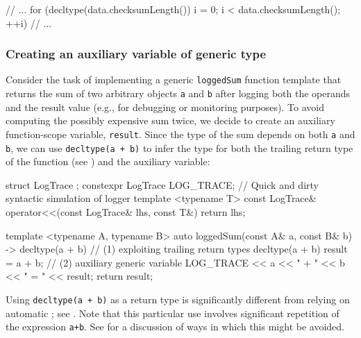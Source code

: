 \begin{emcppshiddenlisting}[emcppsbatch=e7]
void g(const Packet &data)
{
\end{emcppshiddenlisting}
\begin{emcppslisting}[emcppsbatch=e7]
// ...
for (decltype(data.checksumLength()) i = 0; i < data.checksumLength(); ++i)
// ...
\end{emcppslisting}
\begin{emcppshiddenlisting}[emcppsbatch=e7]
{}
} // end g
\end{emcppshiddenlisting}    

\subsubsection[Creating an auxiliary variable of generic type]{Creating an auxiliary variable of generic type}\label{creating-an-auxiliary-variable-of-generic-type}

Consider the task of implementing a generic \lstinline!loggedSum! function
template that returns the sum of two arbitrary objects \lstinline!a! and
\lstinline!b! after logging both the operands and the result value (e.g.,
for debugging or monitoring purposes). To avoid computing the possibly
expensive sum twice, we decide to create an auxiliary function-scope
variable, \lstinline!result!. Since the type of the sum depends on both
\lstinline!a! and \lstinline!b!, we can use
\lstinline!decltype(a!~\lstinline!+!~\lstinline!b)! to infer the type for both
the trailing return type of the
function (see %
) and the auxiliary variable:

\begin{emcppshiddenlisting}[emcppsbatch=e8]
struct LogTrace {};  
constexpr LogTrace LOG_TRACE; // Quick and dirty syntactic simulation of logger
template <typename T>
const LogTrace& operator<<(const LogTrace& lhs, const T&) { return lhs; }
\end{emcppshiddenlisting}
\begin{emcppslisting}[emcppsbatch=e8]
template <typename A, typename B>
auto loggedSum(const A& a, const B& b)
    -> decltype(a + b)                 // (1) exploiting trailing return types
{
    decltype(a + b) result = a + b;    // (2) auxiliary generic variable
    LOG_TRACE << a << " + " << b << " = " << result;
    return result;
}
\end{emcppslisting}
Using \lstinline!decltype(a!~\lstinline!+!~\lstinline!b)! as a return type is significantly different from relying on automatic ; see . Note that this particular use involves significant repetition of the expression \lstinline!a+b!.  See
for a discussion of ways in which this might be avoided.

